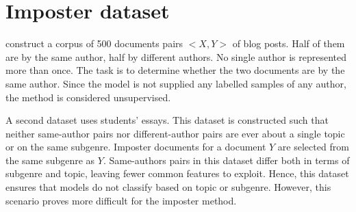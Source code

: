 \section{Imposter dataset}
\label{sec:impostor_dataset}

\citet{koppel_determining_2014} construct a corpus of 500 documents pairs $<X,Y>$ of blog posts.
Half of them are by the same author, half by different authors.
No single author is represented more than once.
The task is to determine whether the two documents are by the same author.
Since the model is not supplied any labelled samples of any author, the method is considered unsupervised.

A second dataset uses students' essays.
This dataset is constructed such that neither same-author pairs nor different-author pairs 
are ever about a single topic or on the same subgenre.
Imposter documents for a document $Y$ are selected from the same subgenre as $Y$.
Same-authors pairs in this dataset differ both in terms of subgenre and topic, leaving fewer common features to exploit.
Hence, this dataset ensures that models do not classify based on topic or subgenre.
However, this scenario proves more difficult for the imposter method.